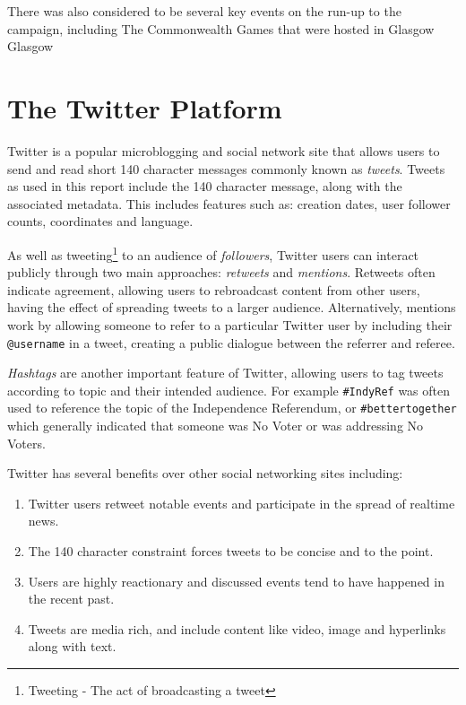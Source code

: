 \documentclass[bsc,frontabs,singlespacing,parskip]{infthesis}     %
\begin{document}
There was also considered to be several key events on the run-up to the campaign, including The Commonwealth Games that were hosted in Glasgow Glasgow

\section{The Twitter Platform}
\label{sec:twitterplatform}
Twitter is a popular microblogging and social network site that allows users to send and read short 140 character messages commonly known as \textit{tweets}. Tweets as used in this report include the 140 character message, along with the associated metadata. This includes features such as: creation dates, user follower counts, coordinates and language. 

As well as tweeting\footnote{Tweeting - The act of broadcasting a tweet} to an audience of \textit{followers}, Twitter users can interact publicly through two main approaches: \textit{retweets} and \textit{mentions}. Retweets often indicate agreement\cite{retweetagreement}, allowing users to rebroadcast content from other users, having the effect of spreading tweets to a larger audience\cite{largeraudiance}. Alternatively, mentions work by allowing someone to refer to a particular Twitter user by including their \texttt{@username} in a tweet, creating a public dialogue between the referrer and referee.

\textit{Hashtags} are another important feature of Twitter, allowing users to tag tweets according to topic and their intended audience. For example \texttt{\#IndyRef} was often used to reference the topic of the Independence Referendum, or \texttt{\#bettertogether} which generally indicated that someone was No Voter or was addressing No Voters.

Twitter has several benefits over other social networking sites \cite{benefitsoftwitter}\cite{quantpol} including:
\begin{enumerate}
\item{Twitter users retweet notable events and participate in the spread of realtime news.}
\item{The 140 character constraint forces tweets to be concise and to the point.}
\item{Users are highly reactionary and discussed events tend to have happened in the recent past.}
\item{Tweets are media rich, and include content like video, image and hyperlinks along with text.} 
\end{enumerate}
\end{document}
